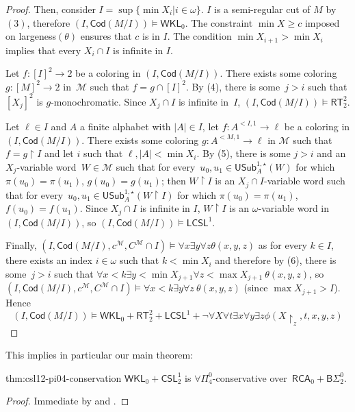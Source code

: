 \documentclass{article}
\numberwithin{theorem}{section}
\newtheorem{corollary}[theorem]{Corollary}
\newcommand{\RCA}{\mathsf{RCA}}
\newcommand{\WKL}{\mathsf{WKL}}
\newcommand{\CSL}{\mathsf{CSL}}
\newcommand{\RFCSL}{\mathsf{LCSL}}
\newcommand{\BSig}{\mathsf{B}\Sigma^0}
\newcommand{\RT}{\mathsf{RT}}
\newcommand{\M}{\mathcal{M}}
\newcommand{\uh}[0]{{\upharpoonright}}
\newcommand{\USub}{\mathsf{USub}}
\newcommand{\Cod}{\mathsf{Cod}}
\begin{document}
\begin{proof}
Then, consider $I = \sup \{\min X_i | i \in \omega\}$. $I$ is a semi-regular cut of $M$ by $(3)$, therefore $(I, \mathsf{Cod}(M/I)) \models \WKL_0$. The constraint $\min X \geq c$ imposed on largeness$(\theta)$ ensures that $c$ is in $I$. The condition $\min X_{i+1} > \min X_i$ implies that every $X_i \cap I$ is infinite in $I$.

Let $f : [I]^2 \to 2$ be a coloring in $(I, \Cod(M/I))$. There exists some coloring $g : [M]^2 \to 2$ in~$\M$ such that $f = g \cap [I]^2$. By (4), there is some~$j > i$ such that $[X_j]^2$ is $g$-monochromatic. Since $X_j \cap I$ is infinite in~$I$, $(I, \Cod(M/I)) \models \RT^2_2$.

Let $\ell \in I$ and $A$ a finite alphabet with $|A| \in I$, let $f : A^{<I,1} \to \ell$ be a coloring in $(I, \Cod(M/I))$. There exists some coloring $g : A^{<M,1} \to \ell$ in $\M$ such that $f = g \uh I$ and let $i$ such that $\ell, |A| < \min X_i$. By (5), there is some $j > i$ and an $X_j$-variable word~$W \in \M$ such that for every~$u_0, u_1 \in \USub^{1,\star}_A(W)$ for which $\pi(u_0) = \pi(u_1)$, $g(u_0) = g(u_1)$; then $W \uh I$ is an $X_j \cap I$-variable word such that for every~$u_0, u_1 \in \USub^{1,\star}_A(W \uh I)$ for which $\pi(u_0) = \pi(u_1)$, $f(u_0) = f(u_1)$. Since $X_j \cap I$ is infinite in $I$, $W \uh I$ is an $\omega$-variable word in $(I, \Cod(M/I))$, so $(I, \Cod(M/I)) \models \RFCSL^1$.

Finally, $(I, \mathsf{Cod}(M/I),c^{\M},C^{\M}\cap I) \models \forall x \exists y \forall z \theta(x,y,z)$ %
as for every $k \in I$, there exists an index $i \in \omega$ such that $k < \min X_i$ and therefore by (6), there is some~$j > i$ such that $\forall x < k \exists y < \min X_{j+1} \forall z < \max X_{j+1} \ \theta(x,y,z)$, so $(I, \mathsf{Cod}(M/I), c^{\M},C^{\M} \cap I) \models \forall x < k \exists y \forall z \ \theta(x,y,z)$ (since $\max X_{j+1} > I$). %
Hence 
$$(I, \mathsf{Cod}(M/I)) \models \WKL_0 + \RT^2_2 + \RFCSL^1 + \neg \forall X \forall t \exists x \forall y \exists z \phi(X \uh_z,t,x,y,z)$$
\end{proof}

This implies in particular our main theorem:

\begin{repmaintheorem}{thm:csl12-pi04-conservation}
$\WKL_0 + \CSL^1_2$ is $\forall \Pi^0_4$-conservative over~$\RCA_0 + \BSig_2$.
\end{repmaintheorem}
\begin{proof}
Immediate by  and .
\end{proof}
\end{document}
